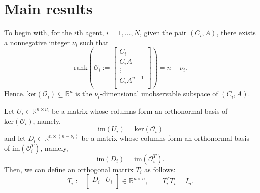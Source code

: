\documentclass[twocolumn]{autart}
\newcommand{\RR}{\mathbb{R}}
\newtheorem{Remark}{Remark}
\begin{document}
\section{Main results}\label{Section_Main_Results}
To begin with, for the $i$th agent, $i=1,\ldots,N$,
given the pair $(C_{i}, A)$,
there exists a nonnegative integer $\nu_{i}$ such that
\begin{equation*}
    \text{rank}\left(\mathcal{O}_{i}:=\left[
                                    \begin{array}{c}
                                      C_{i} \\
                                      C_{i}A \\
                                      \vdots \\
                                      C_{i}A^{n-1} \\
                                    \end{array}
                                  \right]
     \right)=n-\nu_{i}.
\end{equation*}
Hence, $\text{ker}(\mathcal{O}_{i})\subseteq \RR^{n}$ is the $\nu_{i}$-dimensional unobservable subspace of $(C_{i},A)$.








Let $U_{i} \in \RR^{n \times \nu_{i}}$ be a matrix
whose columns form an orthonormal basis of $\text{ker}(\mathcal{O}_{i})$,
namely,
\begin{equation}\label{eq-U-i-def}
    \text{im}(U_{i})=\text{ker}(\mathcal{O}_{i})
\end{equation}
and let $D_{i} \in \RR^{n \times (n-\nu_{i})}$ be a matrix whose columns form an orthonormal basis of $\text{im}(\mathcal{O}_{i}^{T})$,
namely,
\begin{equation*}
    \text{im}(D_{i})=\text{im}(\mathcal{O}_{i}^{T}).
\end{equation*}
Then, we can define an orthogonal matrix $T_{i}$ as follows:
\begin{equation}\label{eq-T-i-def}
    T_{i}:=\left[
             \begin{array}{cc}
               D_{i} & U_{i} \\
             \end{array}
           \right]\in \RR^{n \times n}, \qquad T_{i}^{T}T_{i}=I_{n}.
\end{equation}
\end{document}

